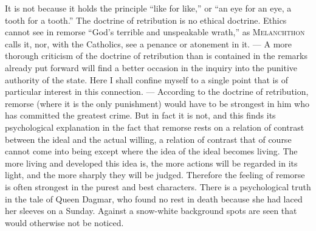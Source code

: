 \documentclass[12pt,a4paper,openany]{book}
\begin{document}
It is not because it holds the principle ``like for like,'' or ``an eye for an eye, a tooth for a
tooth.'' The doctrine of retribution is no ethical doctrine. Ethics cannot see in remorse ``God's
terrible and unspeakable wrath,'' as \textsc{Melanchthon} calls it, nor, with the Catholics, see a penance
or atonement in it. --- A more thorough criticism of the doctrine of retribution than is contained in the
remarks already put forward will find a better occasion in the inquiry into the punitive authority of the
state. Here I shall confine myself to a single point that is of particular interest in this connection.
--- According to the doctrine of retribution, remorse (where it is the only punishment) would have to be
strongest in him who has committed the greatest crime. But in fact it is not, and this finds its
psychological explanation in the fact that remorse rests on a relation of contrast between the ideal and
the actual willing, a relation of contrast that of course cannot come into being except where the idea of
the ideal becomes living. The more living and developed this idea is, the more actions will be regarded in
its light, and the more sharply they will be judged. Therefore the feeling of remorse is often strongest
in the purest and best characters. There is a psychological truth in the tale of Queen Dagmar, who found
no rest in death because she had laced her sleeves on a Sunday. Against a snow-white background spots are
seen that would otherwise not be noticed.
\end{document}
